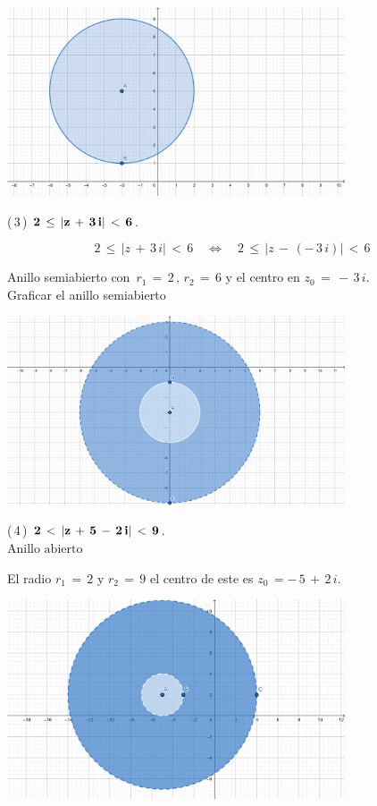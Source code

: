 \documentclass[a4paper,11pt,openany]{book}
\begin{document}
\begin{center}
    \includegraphics[width=10cm]{Gra-Ej-2.png}
\end{center}

\textcolor{ao(english)}{(\,3\,)} $\bf{2\,\leq\,|z\,+\,3\,i|\,<\,6}$.

$$2\,\leq\,|z\,+\,3\,i|\,<\,6 \quad\iff\quad 2\,\leq\,|z\,-\,(-\,3\,i)|\,<\,6$$

Anillo semiabierto con $\, r_{1}\,=\,2\,,\,r_{2}\,=\,6$ y el centro en $z_{0}\,=\,-\,3\,i$.\\

\textcolor{ao(english)}{} Graficar el anillo semiabierto

\begin{center}
     \includegraphics[width=10cm]{Gra-Ej-3.png}
\end{center}

\textcolor{ao(english)}{(\,4\,)} $\bf{2\,<\,|z\,+\,5\,-\,2\,i|\,<\,9}$.\\
$\text{Anillo abierto}$

El radio $r_{1}\,=\,2$ y $r_{2}\,=\,9$ el centro de este es $z_{0}\,=-\,5\,+\,2\,i$.\\

\begin{center}
    \includegraphics[width=10cm]{Gra-Ej-4.png}
\end{center}
\end{document}
